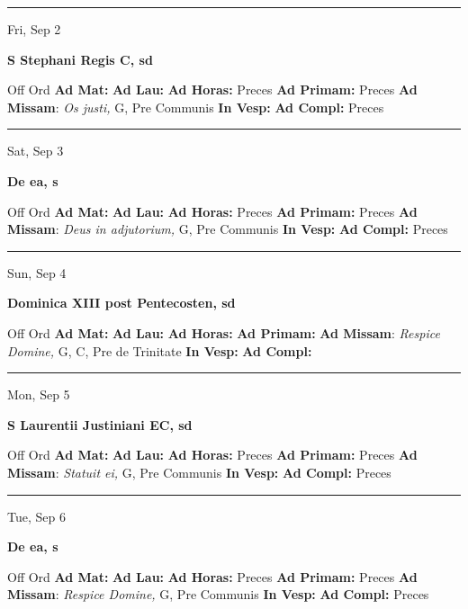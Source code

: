 \documentclass[letterpaper, 10pt]{article}
\begin{document}
\hrule
\begin{center}
Fri, Sep 2
\end{center}\textbf{ \large S Stephani Regis C, \textnormal{\normalsize sd}}
\begin{justify}
Off Ord
\textbf{Ad Mat: }
\textbf{Ad Lau: }
\textbf{Ad Horas: }Preces
\textbf{Ad Primam: }Preces
\textbf{Ad Missam}: \textit{Os justi,} G, Pre Communis
\textbf{In Vesp: }
\textbf{Ad Compl: }Preces\end{justify}



\hrule
\begin{center}
Sat, Sep 3
\end{center}\textbf{ \large De ea, \textnormal{\normalsize s}}
\begin{justify}
Off Ord
\textbf{Ad Mat: }
\textbf{Ad Lau: }
\textbf{Ad Horas: }Preces
\textbf{Ad Primam: }Preces
\textbf{Ad Missam}: \textit{Deus in adjutorium,} G, Pre Communis
\textbf{In Vesp: }
\textbf{Ad Compl: }Preces\end{justify}



\hrule
\begin{center}
Sun, Sep 4
\end{center}\textbf{ \large Dominica XIII post Pentecosten, \textnormal{\normalsize sd}}
\begin{justify}
Off Ord
\textbf{Ad Mat: }
\textbf{Ad Lau: }
\textbf{Ad Horas: }
\textbf{Ad Primam: }
\textbf{Ad Missam}: \textit{Respice Domine,} G, C, Pre de Trinitate
\textbf{In Vesp: }
\textbf{Ad Compl: }\end{justify}



\hrule
\begin{center}
Mon, Sep 5
\end{center}\textbf{ \large S Laurentii Justiniani EC, \textnormal{\normalsize sd}}
\begin{justify}
Off Ord
\textbf{Ad Mat: }
\textbf{Ad Lau: }
\textbf{Ad Horas: }Preces
\textbf{Ad Primam: }Preces
\textbf{Ad Missam}: \textit{Statuit ei,} G, Pre Communis
\textbf{In Vesp: }
\textbf{Ad Compl: }Preces\end{justify}



\hrule
\begin{center}
Tue, Sep 6
\end{center}\textbf{ \large De ea, \textnormal{\normalsize s}}
\begin{justify}
Off Ord
\textbf{Ad Mat: }
\textbf{Ad Lau: }
\textbf{Ad Horas: }Preces
\textbf{Ad Primam: }Preces
\textbf{Ad Missam}: \textit{Respice Domine,} G, Pre Communis
\textbf{In Vesp: }
\textbf{Ad Compl: }Preces\end{justify}
\end{document}

